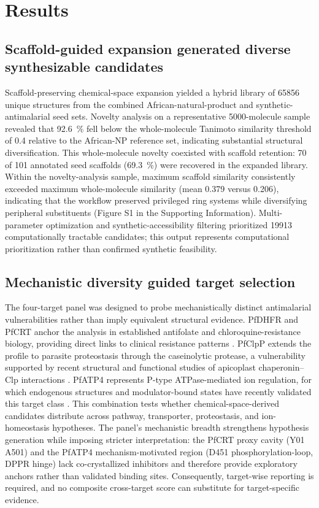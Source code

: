 \documentclass[11pt,a4paper]{article}
\begin{document}
	\section{Results}\label{sec:results}
	\subsection{Scaffold-guided expansion generated diverse synthesizable candidates}\label{sec:results_scaffold}
	Scaffold-preserving chemical-space expansion yielded a hybrid library of \num{65856} unique structures from the combined African-natural-product and synthetic-antimalarial seed sets. Novelty analysis on a representative \num{5000}-molecule sample revealed that \qty{92.6}{\percent} fell below the whole-molecule Tanimoto similarity threshold of \num{0.4} relative to the African-NP reference set, indicating substantial structural diversification. This whole-molecule novelty coexisted with scaffold retention: \num{70} of \num{101} annotated seed scaffolds (\qty{69.3}{\percent}) were recovered in the expanded library. Within the novelty-analysis sample, maximum scaffold similarity consistently exceeded maximum whole-molecule similarity (mean \num{0.379} versus \num{0.206}), indicating that the workflow preserved privileged ring systems while diversifying peripheral substituents (Figure S1 in the Supporting Information). Multi-parameter optimization and synthetic-accessibility filtering prioritized \num{19913} computationally tractable candidates; this output represents computational prioritization rather than confirmed synthetic feasibility.
	
	\subsection{Mechanistic diversity guided target selection}\label{sec:results_mechanistic}
	The four-target panel was designed to probe mechanistically distinct antimalarial vulnerabilities rather than imply equivalent structural evidence. PfDHFR and PfCRT anchor the analysis in established antifolate and chloroquine-resistance biology, providing direct links to clinical resistance patterns \cite{Fidock2000,Ariey2014}. PfClpP extends the profile to parasite proteostasis through the caseinolytic protease, a vulnerability supported by recent structural and functional studies of apicoplast chaperonin--Clp interactions \cite{Tissawak2025}. PfATP4 represents P-type ATPase-mediated ion regulation, for which endogenous structures and modulator-bound states have recently validated this target class \cite{Haile2025}. This combination tests whether chemical-space-derived candidates distribute across pathway, transporter, proteostasis, and ion-homeostasis hypotheses. The panel's mechanistic breadth strengthens hypothesis generation while imposing stricter interpretation: the PfCRT proxy cavity (Y01 A501) and the PfATP4 mechanism-motivated region (D451 phosphorylation-loop, DPPR hinge) lack co-crystallized inhibitors and therefore provide exploratory anchors rather than validated binding sites. Consequently, target-wise reporting is required, and no composite cross-target score can substitute for target-specific evidence.
	
\end{document}
